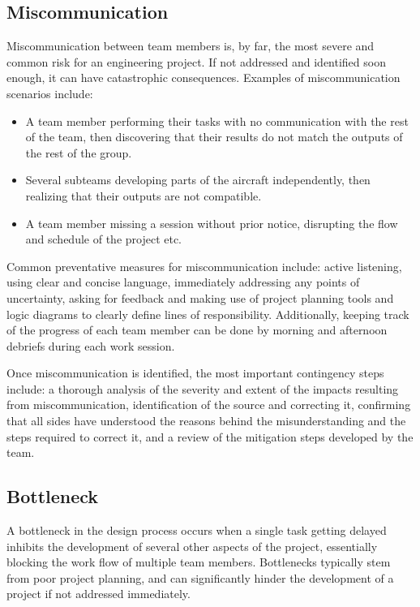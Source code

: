 \subsection{Miscommunication}
Miscommunication between team members is, by far, the most severe and common risk for an engineering project. If not addressed and identified soon enough, it can have catastrophic consequences. Examples of miscommunication scenarios include:
\begin{itemize}
    \item A team member performing their tasks with no communication with the rest of the team, then discovering that their results do not match the outputs of the rest of the group.
    \item Several subteams developing parts of the aircraft independently, then realizing that their outputs are not compatible.
    \item A team member missing a session without prior notice, disrupting the flow and schedule of the project etc.
\end{itemize}

Common preventative measures for miscommunication include: active listening, using clear and concise language, immediately addressing any points of uncertainty, asking for feedback and making use of project planning tools and logic diagrams to clearly define lines of responsibility. Additionally, keeping track of the progress of each team member can be done by morning and afternoon debriefs during each work session.

Once miscommunication is identified, the most important contingency steps include: a thorough analysis of the severity and extent of the impacts resulting from miscommunication, identification of the source and correcting it, confirming that all sides have understood the reasons behind the misunderstanding and the steps required to correct it, and a review of the mitigation steps developed by the team.


\subsection{Bottleneck}
A bottleneck in the design process occurs when a single task getting delayed inhibits the development of several other aspects of the project, essentially blocking the work flow of multiple team members. Bottlenecks typically stem from poor project planning, and can significantly hinder the development of a project if not addressed immediately.

